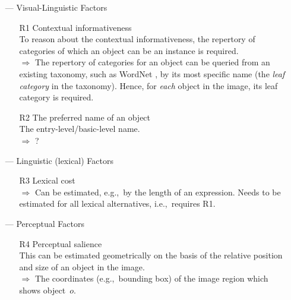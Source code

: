 \begin{itemize}
	\item[---] Visual-Linguistic Factors
	\begin{itemize}
		\item[R1] Contextual informativeness\\
		To reason about the contextual informativeness, the  repertory of categories of which an object can be an instance is required. \\
		$\Rightarrow$ The repertory of categories for an object can be queried from an existing taxonomy, such as WordNet \cite{fellbaum1998wordnet}, by its most specific name (the \textsl{leaf category} in the taxonomy). 
		Hence, for \textit{each} object in the image, its leaf category is required.
		\item[R2] The preferred name of an object\\
		The entry-level/basic-level name.\\
		$\Rightarrow$ ?
	\end{itemize}
	\item[---] Linguistic (lexical) Factors
	\begin{itemize}
		\item[R3] Lexical cost\\
		$\Rightarrow$ Can be estimated, e.g.,~by the length of an expression. Needs to be estimated for all lexical alternatives, i.e.,~requires R1.
	\end{itemize}
	\item[---] Perceptual Factors
	\begin{itemize}
		\item[R4] Perceptual salience\\
		This can be estimated geometrically on the basis of the relative position and size of an object in the image.\\
		$\Rightarrow$ The coordinates (e.g.,~bounding box) of the image region which shows object~$o$. 
	\end{itemize}
\end{itemize}